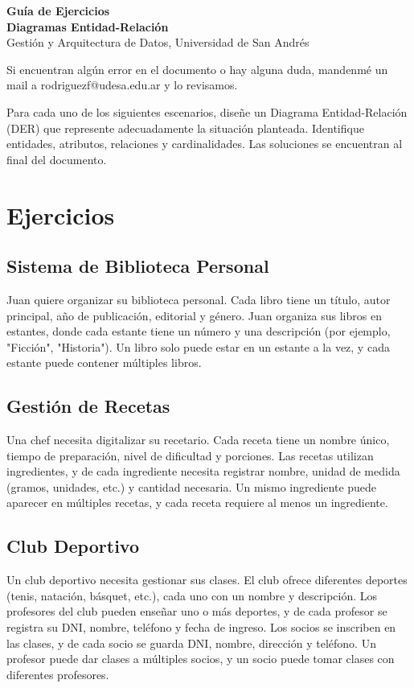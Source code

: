 \documentclass[12pt]{article}
\begin{document}
\begin{center}
  {\LARGE \textbf{Guía de Ejercicios \\ Diagramas Entidad-Relación}}\\[0.5em]
  {Gestión y Arquitectura de Datos, Universidad de San Andrés}
\end{center}

Si encuentran algún error en el documento o hay alguna duda, mandenmé un mail a rodriguezf@udesa.edu.ar y lo revisamos.

\vspace{1em}

Para cada uno de los siguientes escenarios, diseñe un Diagrama Entidad-Relación (DER) que represente adecuadamente la situación planteada. Identifique entidades, atributos, relaciones y cardinalidades. Las soluciones se encuentran al final del documento.

\section{Ejercicios}

\subsection{Sistema de Biblioteca Personal}
Juan quiere organizar su biblioteca personal. Cada libro tiene un título, autor principal, año de publicación, editorial y género. Juan organiza sus libros en estantes, donde cada estante tiene un número y una descripción (por ejemplo, "Ficción", "Historia"). Un libro solo puede estar en un estante a la vez, y cada estante puede contener múltiples libros.

\subsection{Gestión de Recetas}
Una chef necesita digitalizar su recetario. Cada receta tiene un nombre único, tiempo de preparación, nivel de dificultad y porciones. Las recetas utilizan ingredientes, y de cada ingrediente necesita registrar nombre, unidad de medida (gramos, unidades, etc.) y cantidad necesaria. Un mismo ingrediente puede aparecer en múltiples recetas, y cada receta requiere al menos un ingrediente.

\subsection{Club Deportivo}
Un club deportivo necesita gestionar sus clases. El club ofrece diferentes deportes (tenis, natación, básquet, etc.), cada uno con un nombre y descripción. Los profesores del club pueden enseñar uno o más deportes, y de cada profesor se registra su DNI, nombre, teléfono y fecha de ingreso. Los socios se inscriben en las clases, y de cada socio se guarda DNI, nombre, dirección y teléfono. Un profesor puede dar clases a múltiples socios, y un socio puede tomar clases con diferentes profesores.
\end{document}
